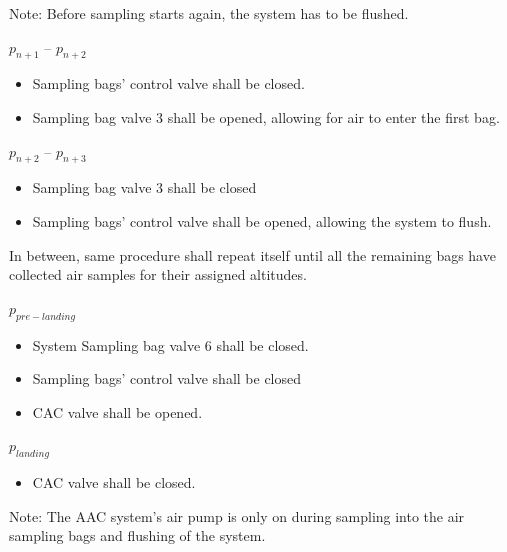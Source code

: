 Note: Before sampling starts again, the system has to be flushed. 

$p_{n+1}$ – $p_{n+2}$
\begin{itemize}
    \item Sampling bags' control valve shall be closed.
    \item Sampling bag valve 3 shall be opened, allowing for air to enter the first bag.
\end{itemize}

$p_{n+2}$ – $p_{n+3}$
\begin{itemize}
    \item Sampling bag valve 3 shall be closed
    \item Sampling bags' control valve shall be opened, allowing the system to flush. 
\end{itemize}

In between, same procedure shall repeat itself until all the remaining bags have collected air samples for their assigned altitudes.

$p_{pre-landing}$ 
\begin{itemize}
    \item System Sampling bag valve 6 shall be closed.
    \item Sampling bags' control valve shall be closed
    \item CAC valve shall be opened.
\end{itemize}


$p_{landing}$
\begin{itemize}
    \item CAC valve shall be closed.
\end{itemize}


Note: The AAC system's air pump is only on during sampling into the air sampling bags and flushing of the system.


\raggedbottom